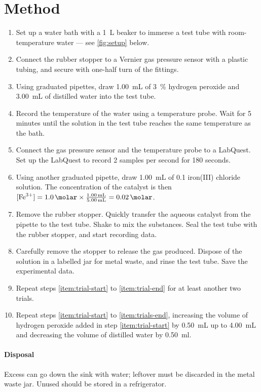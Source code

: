 \documentclass[a4paper, 12pt]{article}
\begin{document}
\section*{Method}
\begin{enumerate}
    \itemsep 0em
    \item Set up a water bath with a \SI{1}{\L} beaker to immerse a test tube with room-temperature water --- see \cref{fig:setup} below.
    \item Connect the rubber stopper to a Vernier gas pressure sensor with a plastic tubing, and secure with one-half turn of the fittings.
    \item \label{item:trial-start} Using graduated pipettes, draw \SI{1.00}{\mL} of \SI{3}{\%} hydrogen peroxide and \SI{3.00}{\mL} of distilled water into the test tube.
    \item Record the temperature of the water using a temperature probe. Wait for 5 minutes until the solution in the test tube reaches the same temperature as the bath.
    \item Connect the gas pressure sensor and the temperature probe to a LabQuest. Set up the LabQuest to record 2 samples per second for 180 seconds.
    \item Using another graduated pipette, draw \SI{1.00}{\mL} of \SI{0.1}{\molar} iron(III) chloride solution. The concentration of the catalyst is then $[\ce{Fe^3+}] = \SI{1.0}{\molar} \times \frac{ \SI{1.00}{\mL} }{ \SI{5.00}{\mL} } = \SI{0.02}{\molar}$.
    \item Remove the rubber stopper. Quickly transfer the aqueous catalyst from the pipette to the test tube. Shake to mix the substances. Seal the test tube with the rubber stopper, and start recording data.
    \item \label{item:trial-end} Carefully remove the stopper to release the gas produced. Dispose of the solution in a labelled jar for metal waste, and rinse the test tube. Save the experimental data.
    \item \label{item:trials-end} Repeat steps \ref{item:trial-start} to \ref{item:trial-end} for at least another two trials.
    \item Repeat steps \ref{item:trial-start} to \ref{item:trials-end}, increasing the volume of hydrogen peroxide added in step \ref{item:trial-start} by \SI{0.50}{\mL} up to \SI{4.00}{\mL} and decreasing the volume of distilled water by \SI{0.50}{\ml}.
\end{enumerate}
\paragraph{Disposal} Excess  can go down the sink with water; leftover  must be discarded in the metal waste jar. Unused  should be stored in a refrigerator.
\end{document}

